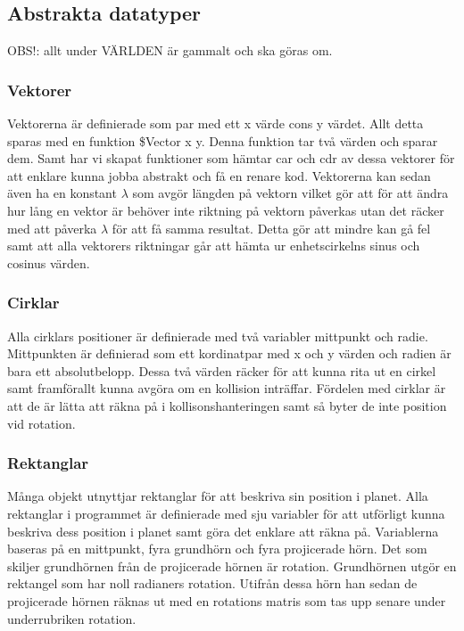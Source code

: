 \documentclass[12pt,a4paper]{article}
\begin{document}
\subsection{Abstrakta datatyper}
 OBS!: allt under VÄRLDEN är gammalt och ska göras om.

\subsubsection{Vektorer}
Vektorerna är definierade som par med ett x värde cons y värdet. Allt detta sparas med en funktion \$Vector x y. Denna funktion tar två värden och sparar dem. Samt har vi skapat funktioner som hämtar car och cdr av dessa vektorer för att enklare kunna jobba abstrakt och få en renare kod. Vektorerna kan sedan även ha en konstant $\lambda$ som avgör längden på vektorn vilket gör att för att ändra hur lång en vektor är behöver inte riktning på vektorn påverkas utan det räcker med att påverka $\lambda$ för att få samma resultat. Detta gör att mindre kan gå fel samt att alla vektorers riktningar går att hämta ur enhetscirkelns sinus och cosinus värden.

\subsubsection{Cirklar}
Alla cirklars positioner är definierade med två variabler mittpunkt och radie. Mittpunkten är definierad som ett kordinatpar med x och y värden och radien är bara ett absolutbelopp. Dessa två värden räcker för att kunna rita ut en cirkel samt framförallt kunna avgöra om en kollision inträffar. Fördelen med cirklar är att de är lätta att räkna på i kollisonshanteringen samt så byter de inte position vid rotation.

\subsubsection{Rektanglar}
Många objekt utnyttjar rektanglar för att beskriva sin position i planet. Alla rektanglar i programmet är definierade med sju variabler för att utförligt kunna beskriva dess position i planet samt göra det enklare att räkna på. Variablerna baseras på en mittpunkt, fyra grundhörn och fyra projicerade hörn. Det som skiljer grundhörnen från de projicerade hörnen är rotation. Grundhörnen utgör en rektangel som har noll radianers rotation. Utifrån dessa hörn han sedan de projicerade hörnen räknas ut med en rotations matris som tas upp senare under underrubriken rotation. \\
\end{document}

